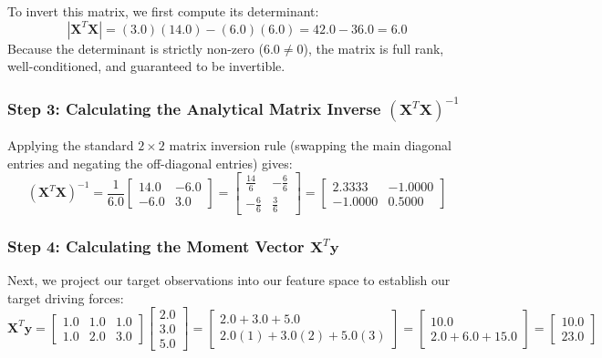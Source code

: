\documentclass{article}
\begin{document}
To invert this matrix, we first compute its determinant:
\begin{equation}
|\mathbf{X}^T \mathbf{X}| = (3.0)(14.0) - (6.0)(6.0) = 42.0 - 36.0 = \mathbf{6.0}
\end{equation}
Because the determinant is strictly non-zero ($6.0 \neq 0$), the matrix is full rank, well-conditioned, and guaranteed to be invertible.

\subsubsection{Step 3: Calculating the Analytical Matrix Inverse $(\mathbf{X}^T\mathbf{X})^{-1}$}
Applying the standard $2 \times 2$ matrix inversion rule (swapping the main diagonal entries and negating the off-diagonal entries) gives:
\begin{equation}
\left(\mathbf{X}^T \mathbf{X}\right)^{-1} = \frac{1}{6.0} \begin{bmatrix} 14.0 & -6.0 \\ -6.0 & 3.0 \end{bmatrix} = \begin{bmatrix} \frac{14}{6} & -\frac{6}{6} \\ -\frac{6}{6} & \frac{3}{6} \end{bmatrix} = \begin{bmatrix} \mathbf{2.3333} & \mathbf{-1.0000} \\ \mathbf{-1.0000} & \mathbf{0.5000} \end{bmatrix}
\end{equation}

\subsubsection{Step 4: Calculating the Moment Vector $\mathbf{X}^T\mathbf{y}$}
Next, we project our target observations into our feature space to establish our target driving forces:
\begin{equation}
\mathbf{X}^T \mathbf{y} = \begin{bmatrix} 1.0 & 1.0 & 1.0 \\ 1.0 & 2.0 & 3.0 \end{bmatrix} \begin{bmatrix} 2.0 \\ 3.0 \\ 5.0 \end{bmatrix} = \begin{bmatrix} 2.0 + 3.0 + 5.0 \\ 2.0(1) + 3.0(2) + 5.0(3) \end{bmatrix} = \begin{bmatrix} 10.0 \\ 2.0 + 6.0 + 15.0 \end{bmatrix} = \begin{bmatrix} \mathbf{10.0} \\ \mathbf{23.0} \end{bmatrix}
\end{equation}
\end{document}
